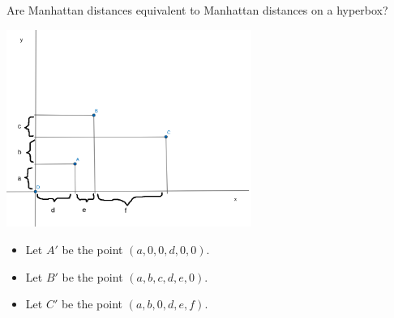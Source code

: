 \begin{frame}{Are Manhattan distances equivalent to Manhattan distances
  on a hyperbox?}
   \begin{center}
     \includegraphics[width=0.6\textwidth]{figs/boxtheorem2-05.png}
   \end{center}
\begin{itemize}[<+->]
 \item Let $A'$ be the point $(a, 0, 0, d, 0, 0)$.
 \item Let $B'$ be the point $(a, b, c, d, e, 0)$.
 \item Let $C'$ be the point $(a, b, 0, d, e, f)$.
\end{itemize}

\end{frame}
